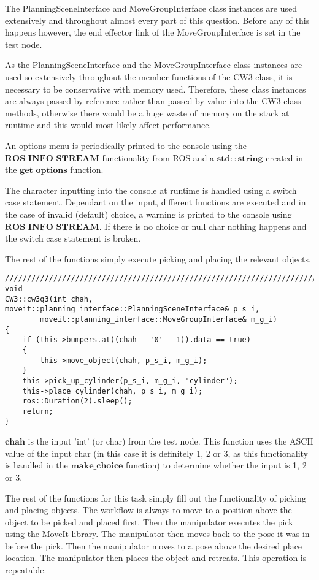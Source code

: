 \documentclass{homework}
\begin{document}
The PlanningSceneInterface and MoveGroupInterface class instances are used extensively and throughout almost every part of this question. Before any of this happens however, the end effector link of the MoveGroupInterface is set in the test node.

As the PlanningSceneInterface and the MoveGroupInterface class instances are used so extensively throughout the member functions of the CW3 class, it is necessary to be conservative with memory used. Therefore, these class instances are always passed by reference rather than passed by value into the CW3 class methods, otherwise there would be a huge waste of memory on the stack at runtime and this would most likely affect performance. 

An options menu is periodically printed to the console using the $\boldsymbol{ROS\_INFO\_STREAM}$ functionality from ROS and a $\boldsymbol{std::string}$ created in the $\boldsymbol{get\_options}$ function.

The character inputting into the console at runtime is handled using a switch case statement. Dependant on the input, different functions are executed and in the case of invalid (default) choice, a warning is printed to the console using $\boldsymbol{ROS\_INFO\_STREAM}$. If there is no choice or null char nothing happens and the switch case statement is broken.

The rest of the functions simply execute picking and placing the relevant objects. 

\begin{verbatim}
////////////////////////////////////////////////////////////////////////////////
void
CW3::cw3q3(int chah, moveit::planning_interface::PlanningSceneInterface& p_s_i,
		moveit::planning_interface::MoveGroupInterface& m_g_i)
{
	if (this->bumpers.at((chah - '0' - 1)).data == true)
	{
		this->move_object(chah, p_s_i, m_g_i);
	}
	this->pick_up_cylinder(p_s_i, m_g_i, "cylinder");
	this->place_cylinder(chah, p_s_i, m_g_i);
	ros::Duration(2).sleep();
	return;
}
\end{verbatim}

$\boldsymbol{chah}$ is the input 'int' (or char) from the test node. This function uses the ASCII value of the input char (in this case it is definitely 1, 2 or 3, as this functionality is handled in the $\boldsymbol{make\_choice}$ function) to determine whether the input is 1, 2 or 3.

The rest of the functions for this task simply fill out the functionality of picking and placing objects. The workflow is always to move to a position above the object to be picked and placed first. Then the manipulator executes the pick using the MoveIt library. The manipulator then moves back to the pose it was in before the pick. Then the manipulator moves to a pose above the desired place location. The manipulator then places the object and retreats. This operation is repeatable. 
\end{document}
